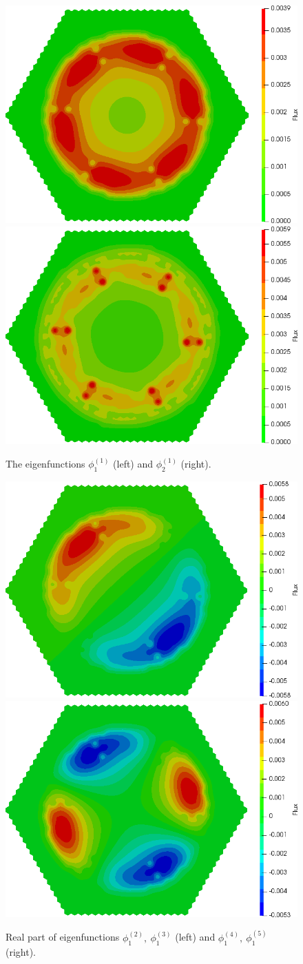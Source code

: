 \documentclass[authoryear]{elsarticle}
\begin{document}
\begin{figure}[H]
\begin{center}
	\includegraphics[width=0.49\linewidth]{hwr/alpha_sp3_rx1_1.png}
	\includegraphics[width=0.49\linewidth]{hwr/alpha_sp3_rx2_1.png}\\
	\caption{The eigenfunctions $\phi^{(1)}_1$ (left) and $\phi^{(1)}_2$ (right).}
	\label{fig:hwr_fun_1}
\end{center}
\end{figure}
\begin{figure}[H]
\begin{center}
	\includegraphics[width=0.49\linewidth]{hwr/alpha_sp3_rx1_2.png}
	\includegraphics[width=0.49\linewidth]{hwr/alpha_sp3_rx1_4.png}\\
	\caption{Real part of eigenfunctions $\phi^{(2)}_1, \ \phi^{(3)}_1$ (left) and $\phi^{(4)}_1, \ \phi^{(5)}_1$ (right).}
	\label{fig:hwr_fun_2}
\end{center}
\end{figure}
\end{document}
